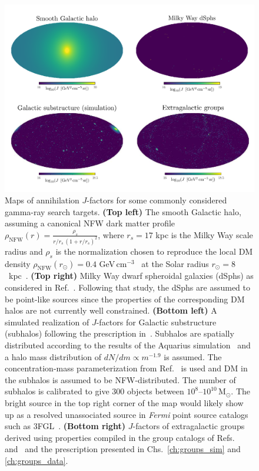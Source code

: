 \begin{figure}[htbp] 
\centering
 \includegraphics[width=1.0\textwidth]{ch-intro/jfactors_red.pdf}
\caption{Maps of annihilation $J$-factors for some commonly considered gamma-ray search targets. \textbf{(Top left)} The smooth Galactic halo, assuming a canonical NFW dark matter profile $\rho_\text{NFW}(r)=\frac{\rho_{s}}{r/r_{s}\,(1+r/r_{s})^{2}}$, where $r_s=17$ kpc is the Milky Way scale radius and $\rho_s$ is the normalization chosen to reproduce the local DM density $\rho_\text{NFW}(r_\odot) = 0.4$ GeV$\,$cm$^{-3}$~\cite{2015ApJ...814...13M,Sivertsson:2017rkp} at the Solar radius $r_\odot = 8$~kpc~\cite{Read:2014qva}. \textbf{(Top right)} Milky Way dwarf spheroidal galaxies (dSphs) as considered in Ref.~\cite{Fermi-LAT:2016uux}. Following that study, the dSphs are assumed to be point-like sources since the properties of the corresponding DM halos are not currently well constrained. \textbf{(Bottom left)} A simulated realization of $J$-factors for Galactic substructure (subhalos) following the prescription in~\cite{Hutten:2016jko}. Subhalos are spatially distributed according to the results of the Aquarius simulation~\cite{Springel:2008cc} and a halo mass distribution of $dN/dm\propto m^{-1.9}$ is assumed. The concentration-mass parameterization from Ref.~\cite{Sanchez-Conde:2013yxa} is used and DM in the subhalos is assumed to be NFW-distributed. The number of subhalos is calibrated to give 300 objects between $10^8$--$10^{10}$\,M$_\odot$. The bright source in the top right corner of the map would likely show up as a resolved unassociated source in \emph{Fermi} point source catalogs such as 3FGL~\cite{Bertoni:2015mla}. \textbf{(Bottom right)} $J$-factors of extragalactic groups derived using properties compiled in the group catalogs of Refs.~\cite{Tully:2015opa} and~\cite{2017ApJ...843...16K} and the prescription presented in Chs.~\ref{ch:groups_sim} and \ref{ch:groups_data}.}  
\label{fig:sources}
\end{figure}


